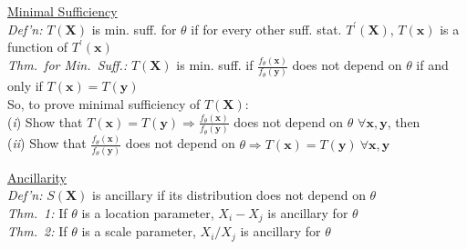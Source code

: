 \documentclass[11pt]{article}
\begin{document}
\indent\underline{Minimal Sufficiency}\\
{\it Def'n:} $T(\mathbf{X})$ is min. suff. for $\theta$ if for every other suff.
stat. $T^\prime(\mathbf{X})$, $T(\mathbf{x})$ is a function of $T^\prime(\mathbf{x})$\\
%
{\it Thm.\ for Min.\ Suff.:}  $T(\mathbf{X})$ is min. suff. if
$\frac{f_\theta(\mathbf{x})}{f_\theta(\mathbf{y})}$ does not depend on $\theta$ if and
only if $T(\mathbf{x})=T(\mathbf{y})$ \\
\hspace*{1.5em} So, to prove minimal sufficiency of $T(\mathbf{X})$:\\
\hspace*{3.0em}({\em i}\/) Show that $T(\mathbf{x})=T(\mathbf{y}) \Longrightarrow
\frac{f_\theta(\mathbf{x})}{f_\theta(\mathbf{y})}$ does not depend on $\theta$ $\forall
\mathbf{x},\mathbf{y}$, then  \\
\hspace*{3.0em}({\em ii}\/)  Show that $\frac{f_\theta(\mathbf{x})}{f_\theta(\mathbf{y})}$ does not
depend on $\theta \Longrightarrow T(\mathbf{x})=T(\mathbf{y}) ~\forall \mathbf{x},\mathbf{y}$

\indent\underline{Ancillarity}\\
{\it Def'n:} $S(\mathbf{X})$ is ancillary if its distribution does not depend on $\theta$\\
{\it Thm.\ 1:} If $\theta$ is a location parameter, $X_i - X_j$ is ancillary for $\theta$\\
{\it Thm.\ 2:} If $\theta$ is a scale parameter, $X_i / X_j$ is ancillary for $\theta$
\end{document}
